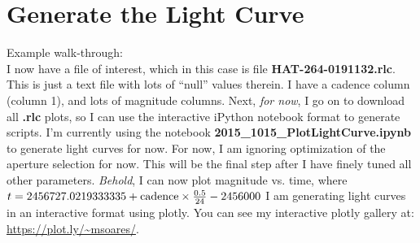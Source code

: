 \section*{Generate the Light Curve}
Example walk-through:\\
I now have a file of interest, which in this case is file \textbf{HAT-264-0191132.rlc}. This is just a text file with lots of ``null'' values therein. 
I have a cadence column (column 1), and lots of magnitude columns. 
Next, \textit{for now},  I go on to download all \textbf{.rlc} plots, so I can use the interactive iPython notebook format to generate scripts. 
I'm currently using the notebook \textbf{2015\_1015\_PlotLightCurve.ipynb} to generate light curves for now. 
For now, I am ignoring optimization of the aperture selection for now. This will be the final step after I have finely tuned all other parameters.
\textit{Behold}, I can now plot magnitude vs. time, where $t \rm = 2456727.0219333335+cadence \times \frac{0.5}{24}- 2456000$ 
I am generating light curves in an interactive format using plotly. You can see my interactive plotly gallery at:\\
\url{https://plot.ly/~msoares/}.

